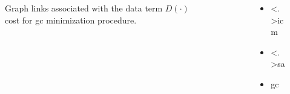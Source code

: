 \begin{frame}
\begin{columns}
\begin{column}{.6\textwidth}
\begin{figure}
\begin{tikzpicture}[y=0.80pt,x=0.80pt,yscale=-1, inner sep=0pt, outer sep=0pt]
 
  
\end{tikzpicture}  
\caption{Graph links associated with the data term $D(\cdot)$ cost for \ac{gc} minimization procedure.}
\end{figure}
\end{column}
\begin{column}{1cm}
\end{column}
\begin{column}{.4\textwidth}
		\begin{itemize}
		\item <.>\acf{icm}		
		\item <.>\acf{sa}
		\item  \acf{gc}
		\end{itemize}
\end{column}
\end{columns}
\end{frame}

